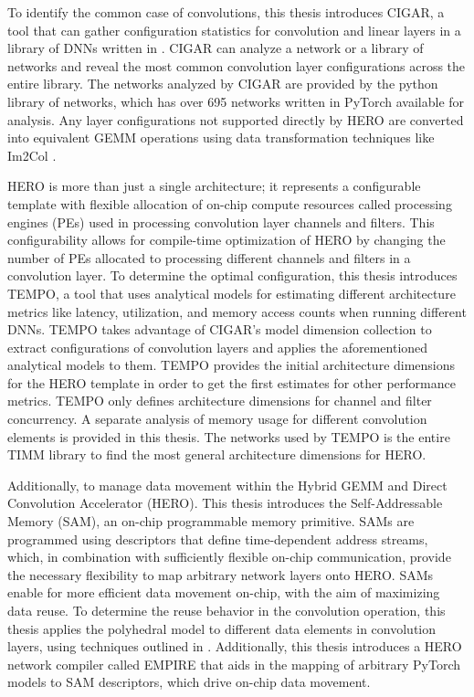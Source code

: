 To identify the common case of convolutions, this thesis
introduces CIGAR, a tool that can gather configuration statistics for
convolution and linear layers in a library of DNNs written in \cite{pytorch}. CIGAR can
analyze a network or a library of networks and reveal the most common
convolution layer configurations across the entire library. The networks
analyzed by CIGAR are provided by the \cite{timm} python library of networks, which has
over 695 networks written in PyTorch available for analysis. Any layer configurations
not supported directly by HERO are converted into equivalent GEMM operations
using data transformation techniques like Im2Col
\cite{cafe_con_troll}.


HERO is more than just a single architecture; it represents a configurable
template with flexible allocation of on-chip compute resources called processing
engines (PEs) used in processing convolution layer channels and filters. This
configurability allows for compile-time optimization of HERO by changing the
number of PEs allocated to processing different channels and filters in a
convolution layer. To determine the optimal configuration, this thesis
introduces TEMPO, a tool that uses analytical models for estimating different
architecture metrics like latency, utilization, and memory access counts when
running different DNNs. TEMPO takes advantage of CIGAR's model dimension
collection to extract configurations of convolution layers and applies the
aforementioned analytical models to them. TEMPO provides the initial
architecture dimensions for the HERO template in order to get the first
estimates for other performance metrics. TEMPO only defines architecture dimensions for
channel and filter concurrency. A separate analysis of memory usage for
different convolution elements is provided in this thesis. The networks  used by
TEMPO is the entire TIMM library to find the most general architecture
dimensions for HERO.


Additionally, to manage data movement within the Hybrid GEMM and Direct
Convolution Accelerator (HERO). This thesis introduces the Self-Addressable
Memory (SAM), an on-chip programmable memory primitive. SAMs are programmed
using descriptors that define time-dependent address streams, which, in
combination with sufficiently flexible on-chip communication, provide the
necessary flexibility to map arbitrary network layers onto HERO. SAMs enable for
more efficient data movement on-chip, with the aim of maximizing data reuse. To
determine the reuse behavior in the convolution operation, this thesis applies
the polyhedral model to different data elements in convolution layers, using
techniques outlined in \cite{meeus}. Additionally, this thesis introduces a HERO
network compiler called EMPIRE that aids in the mapping of arbitrary PyTorch
models to SAM descriptors, which drive on-chip data movement.


